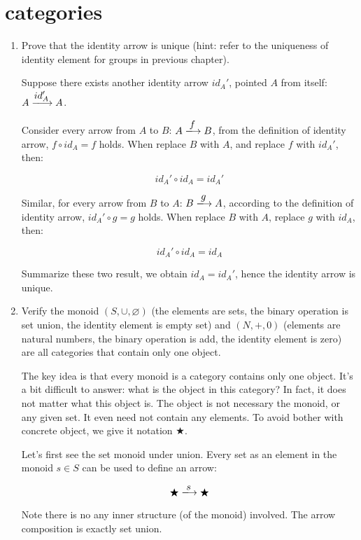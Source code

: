 \documentclass[UTF8]{article}
\begin{document}
\section{categories}

\begin{enumerate}
\item {Prove that the identity arrow is unique (hint: refer to the uniqueness of identity element for groups in previous chapter).}

Suppose there exists another identity arrow $id_A'$, pointed $A$ from itself: $A \arrowto{id_A'} A$.

Consider every arrow from $A$ to $B$: $A \arrowto{f} B$, from the definition of identity arrow, $f \circ id_A = f$ holds. When replace $B$ with $A$, and replace $f$ with $id_A'$, then:

\[
id_A' \circ id_A = id_A'
\]

Similar, for every arrow from $B$ to $A$: $B \arrowto{g} A$, according to the definition of identity arrow, $id_A' \circ g = g$ holds. When replace $B$ with $A$, replace $g$ with $id_A$, then:

\[
id_A' \circ id_A = id_A
\]

Summarize these two result, we obtain $id_A = id_A'$, hence the identity arrow is unique.

\item {Verify the monoid $(S, \cup, \varnothing)$ (the elements are sets, the binary operation is set union, the identity element is empty set) and $(N, +, 0)$ (elements are natural numbers, the binary operation is add, the identity element is zero) are all categories that contain only one object.}

The key idea is that every monoid is a category contains only one object. It's a bit difficult to answer: what is the object in this category? In fact, it does not matter what this object is. The object is not necessary the monoid, or any given set. It even need not contain any elements. To avoid bother with concrete object, we give it notation $\bigstar$.

Let's first see the set monoid under union. Every set as an element in the monoid $s \in S$ can be used to define an arrow:

\[
\bigstar \arrowto{s} \bigstar
\]

Note there is no any inner structure (of the monoid) involved. The arrow composition is exactly set union.

\begin{center}
\end{center}


\end{enumerate}
\end{document}
